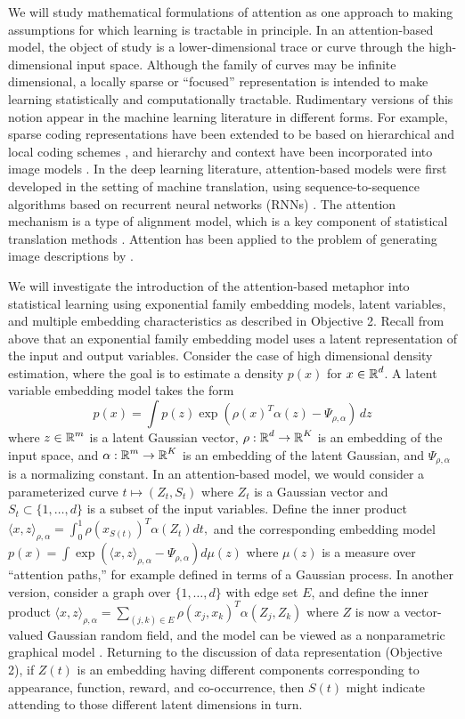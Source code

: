 We will study mathematical formulations of attention as one approach
to making assumptions for which learning is tractable in principle.
In an attention-based model, the object of study is a
lower-dimensional trace or curve through the high-dimensional input
space. Although the family of curves may be infinite dimensional, a
locally sparse or ``focused'' representation is intended to make
learning statistically and computationally tractable. Rudimentary
versions of this notion appear in the machine learning literature in
different forms.  For example, sparse coding representations have
been extended to be based on hierarchical and local coding schemes
\citep{WangYYLHG10,YuLL11}, and hierarchy and context have been 
incorporated into image models \citep{ChangJZBG11,JinG06}. In the
deep learning literature, attention-based models were first developed
in the setting of machine translation, using sequence-to-sequence
algorithms based on recurrent neural networks
(RNNs) \citep{bahdanau2014}. The attention mechanism is a type of
alignment model, which is a key component of statistical translation
methods \citep{Brown1993}. Attention has been applied to the problem of generating image
descriptions by \citet{showtell}.

We will investigate the introduction of the attention-based metaphor into
statistical learning using exponential family embedding models, latent
variables, and multiple embedding characteristics as described in
Objective 2. 
Recall from above that an exponential family embedding model uses a
latent representation of the input and output variables. Consider the
case of high dimensional density estimation, where the goal is to
estimate a density $p(x)$ for $x\in\mbox{$\mathbb{R}$}^d$. A latent variable
embedding model takes the form
$$ p(x) = \int p(z) \exp(\rho(x)^T \alpha(z) - \Psi_{\rho,\alpha}) \, dz$$
where $z\in \mbox{$\mathbb{R}$}^m$ is a latent Gaussian vector,
$\rho:\mbox{$\mathbb{R}$}^d \to \mbox{$\mathbb{R}$}^K$ is an embedding of the input space,
and $\alpha: \mbox{$\mathbb{R}$}^m \to\mbox{$\mathbb{R}$}^K$ is an embedding of the latent
Gaussian, and $\Psi_{\rho,\alpha}$ is a normalizing constant.
In an attention-based model, we would consider a parameterized curve $t\mapsto (Z_t, S_t)$
where $Z_t$ is a Gaussian vector and $S_t \subset \{1,\ldots, d\}$
is a subset of the input variables. Define the inner product 
$\langle x, z\rangle_{\rho,\alpha}
= \int_{0}^1 \rho\left(x_{S(t)}\right)^T \alpha(Z_t) dt,$
and the corresponding embedding model
$ p(x) = \int \exp\left(\langle x, z\rangle_{\rho,\alpha} - \Psi_{\rho,\alpha}\right) d\mu(z)$ where $\mu(z)$ is a 
measure over ``attention paths,'' for example defined in terms of a Gaussian process.
In another version, consider a graph over $\{1,\ldots, d\}$ with edge
set $E$, and define the inner product
$\langle x, z\rangle_{\rho,\alpha}
= \sum_{(j,k)\in E} \rho(x_j, x_k)^T \alpha(Z_j, Z_k)$
where $Z$ is now a vector-valued Gaussian random field, 
and the model can be viewed as a nonparametric graphical model
\citep{hl18}. Returning to the discussion of data representation (Objective 2), 
if $Z(t)$ is an embedding having different components corresponding
to appearance, function, reward, and co-occurrence, then $S(t)$ might 
indicate attending to those different latent dimensions in turn.

